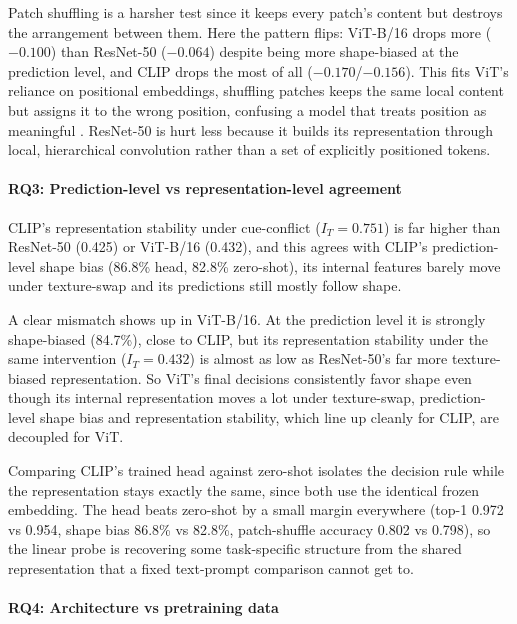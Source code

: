 \documentclass{article}
\begin{document}
Patch shuffling is a harsher test since it keeps every patch's content but destroys the arrangement between them. Here the pattern flips: ViT-B/16 drops more ($-0.100$) than ResNet-50 ($-0.064$) despite being more shape-biased at the prediction level, and CLIP drops the most of all ($-0.170$/$-0.156$). This fits ViT's reliance on positional embeddings, shuffling patches keeps the same local content but assigns it to the wrong position, confusing a model that treats position as meaningful \citep{raghu2021vit}. ResNet-50 is hurt less because it builds its representation through local, hierarchical convolution rather than a set of explicitly positioned tokens.

\paragraph{RQ3: Prediction-level vs representation-level agreement}

CLIP's representation stability under cue-conflict ($I_T = 0.751$) is far higher than ResNet-50 (0.425) or ViT-B/16 (0.432), and this agrees with CLIP's prediction-level shape bias (86.8\% head, 82.8\% zero-shot), its internal features barely move under texture-swap and its predictions still mostly follow shape.

A clear mismatch shows up in ViT-B/16. At the prediction level it is strongly shape-biased (84.7\%), close to CLIP, but its representation stability under the same intervention ($I_T = 0.432$) is almost as low as ResNet-50's far more texture-biased representation. So ViT's final decisions consistently favor shape even though its internal representation moves a lot under texture-swap, prediction-level shape bias and representation stability, which line up cleanly for CLIP, are decoupled for ViT.

Comparing CLIP's trained head against zero-shot isolates the decision rule while the representation stays exactly the same, since both use the identical frozen embedding. The head beats zero-shot by a small margin everywhere (top-1 0.972 vs 0.954, shape bias 86.8\% vs 82.8\%, patch-shuffle accuracy 0.802 vs 0.798), so the linear probe is recovering some task-specific structure from the shared representation that a fixed text-prompt comparison cannot get to.

\paragraph{RQ4: Architecture vs pretraining data}
\end{document}
